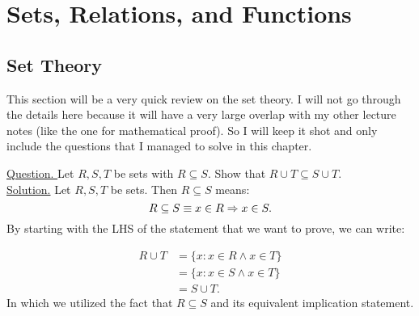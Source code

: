 \section{Sets, Relations, and Functions}

\subsection{Set Theory}

This section will be a very quick review on the set theory. I will not go through the details here because it will have a very large overlap with my other lecture notes (like the one for mathematical proof). So I will keep it shot and only include the questions that I managed to solve in this chapter.


\begin{example}{ }
	\underline{Question. }Let $ R,S,T $ be sets with $ R \subseteq S $. Show that $ R \cup T \subseteq S \cup T $.\\
	
	\underline{Solution.} Let $ R,S,T $ be sets. Then $ R \subseteq S $ means:
	\[ R \subseteq S \equiv x \in R \Rightarrow x \in S. \]
	By starting with the LHS of the statement that we want to prove, we can write:

	\begin{align*}
		R \cup T &= \{ x: x \in R \wedge x \in T \} \\
		&= \{x: x \in S \wedge x \in T \}  \\
		&= S \cup T.
	\end{align*}
	In which we utilized the fact that $ R \subseteq S $ and its equivalent implication statement. 


\end{example}

